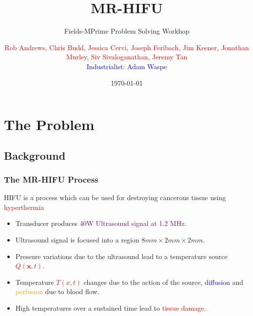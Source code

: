 \documentclass{beamer}
\title{MR-HIFU}
\subtitle {Fields-MPrime Problem Solving Workhop}
\author{ \textcolor{red}{Rob Andrews, Chris Budd, Jessica Cervi, Joseph Feribach, Jim Keener, Jonathan Murley, Siv Sivaloganathan, Jeremy Tan}\\ \textcolor{blue}{ Industrialist: Adam Waspe}}
\date{\today}
\begin{document}
\begin{frame}
\maketitle
\end{frame}
\begin{frame}
 \tableofcontents
\end{frame}

\section{The Problem}
\subsection{Background}
\begin{frame}
\frametitle{The MR-HIFU Process}

HIFU is a process which can be used for destroying cancerous tissue using \textcolor{red}{hyperthermia}

\vspace{0.25in}

\begin{itemize}
\item Transducer produces \textcolor{purple}{40W Ultrasound signal at 1.2 MHz.}
\item Ultrasound signal is focused into a region $8mm \times 2mm \times 2mm$.
\item Pressure variations due to the ultrasound lead to a temperature source \textcolor{red}{$Q({\mathbf x},t)$.}
\item Temperature \textcolor{red}{$T(x,t)$} changes due to the action of the source, \textcolor{blue}{diffusion} and \textcolor{orange}{perfusion} due to blood flow.
\item High temperatures over a sustained time lead to \textcolor{red}{tissue damage.}
\end{itemize}



\end{frame}
\end{document}
